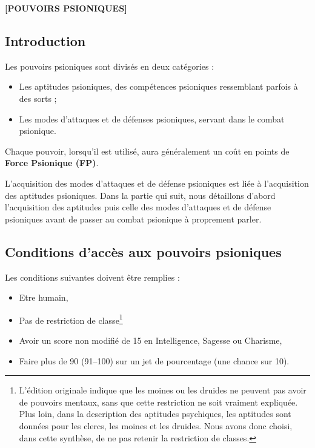 \begin{center}
\textbf{[POUVOIRS PSIONIQUES]}
\end{center}

\subsection*{Introduction}

Les pouvoirs psioniques sont divisés en deux catégories :

\bigskip

\begin{itemize}
\item Les aptitudes psioniques, des compétences psioniques ressemblant parfois à des sorts ;
\item Les modes d'attaques et de défenses psioniques, servant dans le combat psionique.
\end{itemize}

\bigskip

Chaque pouvoir, lorsqu'il est utilisé, aura généralement un coût en points de \textbf{Force Psionique (FP)}.

L'acquisition des modes d'attaques et de défense psioniques est liée à l'acquisition des aptitudes psioniques. Dans la partie qui suit, nous détaillons d'abord l'acquisition des aptitudes puis celle des modes d'attaques et de défense psioniques avant de passer au combat psionique à proprement parler.

\subsection*{Conditions d'accès aux pouvoirs psioniques}

Les conditions suivantes doivent être remplies :

\bigskip

\begin{itemize}
\item Etre humain,
\item Pas de restriction de classe\footnote{L'édition originale indique que les moines ou les druides ne peuvent pas avoir de pouvoirs mentaux, sans que cette restriction ne soit vraiment expliquée. Plus loin, dans la description des aptitudes psychiques, les aptitudes sont données pour les clercs, les moines et les druides. Nous avons donc choisi, dans cette synthèse, de ne pas retenir la restriction de classes.}
\item Avoir un score non modifié de 15 en Intelligence, Sagesse ou Charisme,
\item Faire plus de 90 (91--100) sur un jet de pourcentage (une chance sur 10).
\end{itemize}

